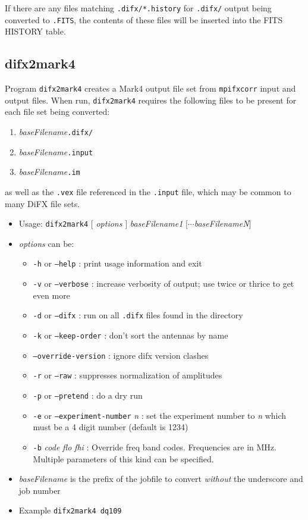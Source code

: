 If there are any files matching {\tt .difx/*.history} for {\tt .difx/} output being converted to {\tt .FITS}, the contents of these files will be inserted into the FITS HISTORY table.







\subsection{difx2mark4} \label{sec:difx2mark4}

Program {\tt difx2mark4} creates a Mark4 output file set from {\tt mpifxcorr} input and output files.
When run, {\tt difx2mark4} requires the following files to be present for each file set being converted:
\begin{enumerate}
\item {\em baseFilename}{\tt .difx/}
\item {\em baseFilename}{\tt .input}
\item {\em baseFilename}{\tt .im}
\end{enumerate}
as well as the {\tt .vex} file referenced in the {\tt .input} file, which may be common to many DiFX file sets.

\begin{itemize}
\item[] Usage: {\tt difx2mark4} $[$ {\em options} $]$ {\em baseFilename1} $[\cdots${\em baseFilenameN}$]$
\item[] {\em options} can be:
\begin{itemize}
\item[] {\tt -h} or {\tt --help} : print usage information and exit
\item[] {\tt -v} or {\tt --verbose} : increase verbosity of output; use twice or thrice to get even more
\item[] {\tt -d} or {\tt --difx} : run on all {\tt .difx} files found in the directory
\item[] {\tt -k} or {\tt --keep-order} : don't sort the antennas by name
\item[] {\tt --override-version} : ignore difx version clashes
\item[] {\tt -r} or {\tt --raw} : suppresses normalization of amplitudes
\item[] {\tt -p} or {\tt --pretend} : do a dry run
\item[] {\tt -e} or {\tt --experiment-number} {\em n} : set the experiment number to {\em n} which must be a 4 digit number (default is 1234)
\item[] {\tt -b} {\em code} {\em flo} {\em fhi} : Override freq band codes.  Frequencies are in MHz.  Multiple parameters of this kind can be specified.
\end{itemize}
\item[] {\em baseFilename} is the prefix of the jobfile to convert {\em without} the underscore and job number
\item[] Example {\tt difx2mark4 dq109}
\end{itemize}






